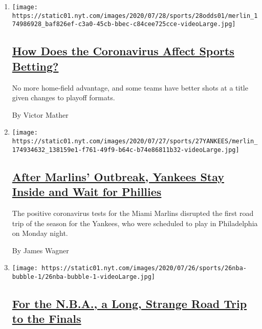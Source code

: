 \begin{enumerate}
\def\labelenumi{\arabic{enumi}.}
\item
  \texttt{[image: https://static01.nyt.com/images/2020/07/28/sports/28odds01/merlin\_174986928\_baf826ef-c3a0-45cb-bbec-c84cee725cce-videoLarge.jpg]}

  \hypertarget{how-does-the-coronavirus-affect-sports-betting}{%
  \subsection{\texorpdfstring{\href{/2020/07/28/sports/coronavirus-sports-betting.html}{How
  Does the Coronavirus Affect Sports
  Betting?}}{How Does the Coronavirus Affect Sports Betting?}}\label{how-does-the-coronavirus-affect-sports-betting}}

  No more home-field advantage, and some teams have better shots at a
  title given changes to playoff formats.

  By Victor Mather
\item
  \texttt{[image: https://static01.nyt.com/images/2020/07/27/sports/27YANKEES/merlin\_174934632\_138159e1-f761-49f9-b64c-b74e86811b32-videoLarge.jpg]}

  \hypertarget{after-marlins-outbreak-yankees-stay-inside-and-wait-for-phillies}{%
  \subsection{\texorpdfstring{\href{/2020/07/27/sports/baseball/coronavirus-yankees-marlins-phillies.html}{After
  Marlins' Outbreak, Yankees Stay Inside and Wait for
  Phillies}}{After Marlins' Outbreak, Yankees Stay Inside and Wait for Phillies}}\label{after-marlins-outbreak-yankees-stay-inside-and-wait-for-phillies}}

  The positive coronavirus tests for the Miami Marlins disrupted the
  first road trip of the season for the Yankees, who were scheduled to
  play in Philadelphia on Monday night.

  By James Wagner
\item
  \texttt{[image: https://static01.nyt.com/images/2020/07/26/sports/26nba-bubble-1/26nba-bubble-1-videoLarge.jpg]}

  \hypertarget{for-the-nba-a-long-strange-road-trip-to-the-finals}{%
  \subsection{\texorpdfstring{\href{/2020/07/27/sports/basketball/coronavirus-nba-season-bubble-disney-world.html}{For
  the N.B.A., a Long, Strange Road Trip to the
  Finals}}{For the N.B.A., a Long, Strange Road Trip to the Finals}}\label{for-the-nba-a-long-strange-road-trip-to-the-finals}}


\end{enumerate}

